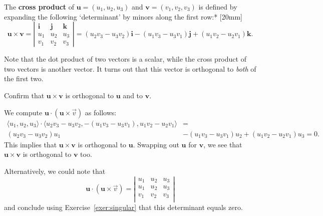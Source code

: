 \documentclass[indent]{watsonbook}
\begin{document}
{The \textbf{cross product} of $\mathbf{u} = (u_1,u_2,u_3)$ and
$\mathbf{v} = (v_1,v_2,v_3)$ is defined by expanding the following
`determinant' by minors along the first row:* 
[20mm]
\[
  \mathbf{u} \times \mathbf{v} =
  \left|
    \begin{array}{ccc}
      \mathbf{i} & \mathbf{j} & \mathbf{k} \\
      u_1 & u_2 & u_3 \\
      v_1 & v_2 & v_3
    \end{array}
  \right| =
  (u_2v_3 - u_3 v_2) \mathbf{i}
  - (u_1 v_3 - u_3 v_1) \mathbf{j}
  + (u_1v_2 - u_2 v_1) \mathbf{k}.
\]

Note that the dot product of two vectors is a scalar, while the cross
product of two vectors is another vector. It turns out that this
vector is orthogonal to \textit{both} of the first two.

\begin{example}{}{}
  Confirm that $\mathbf{u} \times \mathbf{v}$ is orthogonal to
  $\mathbf{u}$ and to $\mathbf{v}$.
\end{example}

\begin{solution}
  We compute $\mathbf{u} \cdot (\mathbf{u} \times \vec{v})$ as
  follows:
  \begin{align*}
    \langle u_1, u_2, u_3 \rangle \cdot \langle u_2v_3 - u_3 v_2,
    - (u_1 v_3 - u_3 v_1),
    u_1v_2 - u_2 v_1 \rangle&= \\
    ( u_2v_3 - u_3 v_2)u_1 &- (u_1 v_3 - u_3 v_1) u_2 +
                             ( u_1v_2 - u_2 v_1) u_3   = 0.
  \end{align*}
  This implies that $\mathbf{u} \times \mathbf{v}$ is orthogonal to
  $\mathbf{u}$. Swapping out $\mathbf{u}$ for $\mathbf{v}$, we see
  that $\mathbf{u} \times \mathbf{v}$ is orthogonal to
  $\mathbf{v}$ too.

  Alternatively, we could note that
  \[
    \mathbf{u} \cdot (\mathbf{u} \times \vec{v}) =
    \left|
      \begin{array}{ccc}
        u_1 & u_2 & u_3 \\        u_1 & u_2 & u_3 \\
        v_1 & v_2 & v_3 \\
      \end{array}
    \right|
  \]
  and conclude using Exercise~\ref{exer:singular} that this
  determinant equals zero.
\end{solution}

}
\end{document}

